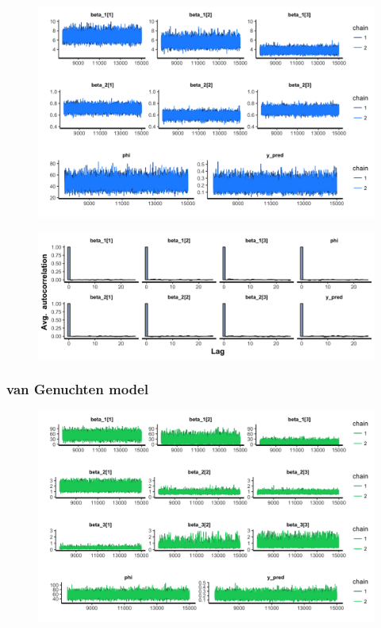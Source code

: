 \documentclass{article}
\begin{document}
\begin{figure}[ht!]
\centering
\includegraphics[width=16cm]{indep_2pars_trace.png}
\end{figure}

\begin{figure}[ht!]
\centering
\includegraphics[width=16cm]{indep_2pars_ac.png}
\end{figure}

\newpage
\subsubsection*{van Genuchten model}
\begin{figure}[ht!]
\centering
\includegraphics[width=16cm]{indep_3pars_trace.png}
\end{figure}
\end{document}
